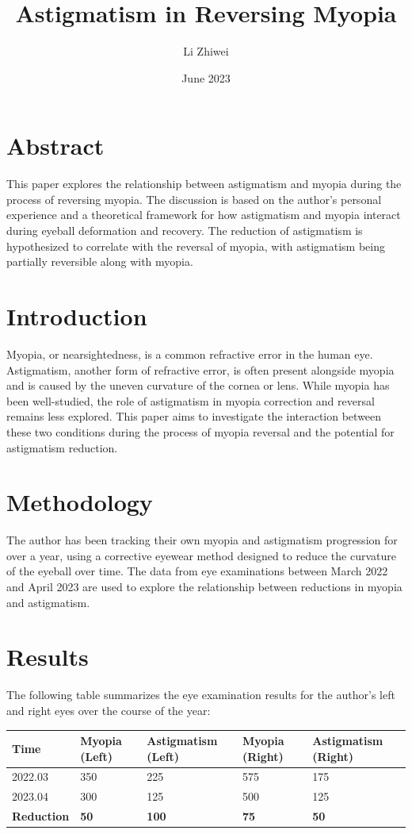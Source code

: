 \documentclass[12pt]{article}
\title{Astigmatism in Reversing Myopia}
\author{Li Zhiwei}
\date{June 2023}
\begin{document}
\maketitle

\section*{Abstract}
This paper explores the relationship between astigmatism and myopia during the process of reversing myopia. The discussion is based on the author's personal experience and a theoretical framework for how astigmatism and myopia interact during eyeball deformation and recovery. The reduction of astigmatism is hypothesized to correlate with the reversal of myopia, with astigmatism being partially reversible along with myopia.

\section{Introduction}
Myopia, or nearsightedness, is a common refractive error in the human eye. Astigmatism, another form of refractive error, is often present alongside myopia and is caused by the uneven curvature of the cornea or lens. While myopia has been well-studied, the role of astigmatism in myopia correction and reversal remains less explored. This paper aims to investigate the interaction between these two conditions during the process of myopia reversal and the potential for astigmatism reduction.

\section{Methodology}
The author has been tracking their own myopia and astigmatism progression for over a year, using a corrective eyewear method designed to reduce the curvature of the eyeball over time. The data from eye examinations between March 2022 and April 2023 are used to explore the relationship between reductions in myopia and astigmatism.

\section{Results}
The following table summarizes the eye examination results for the author’s left and right eyes over the course of the year:

\begin{table}[h!]
\centering
\begin{tabularx}{\textwidth}{|X|X|X|X|X|}
\hline
\textbf{Time} & \textbf{Myopia (Left)} & \textbf{Astigmatism (Left)} & \textbf{Myopia (Right)} & \textbf{Astigmatism (Right)} \\
\hline
2022.03 & 350 & 225 & 575 & 175 \\
2023.04 & 300 & 125 & 500 & 125 \\
\hline
\textbf{Reduction} & \textbf{50} & \textbf{100} & \textbf{75} & \textbf{50} \\
\hline
\end{tabularx}
\end{table}
\end{document}
